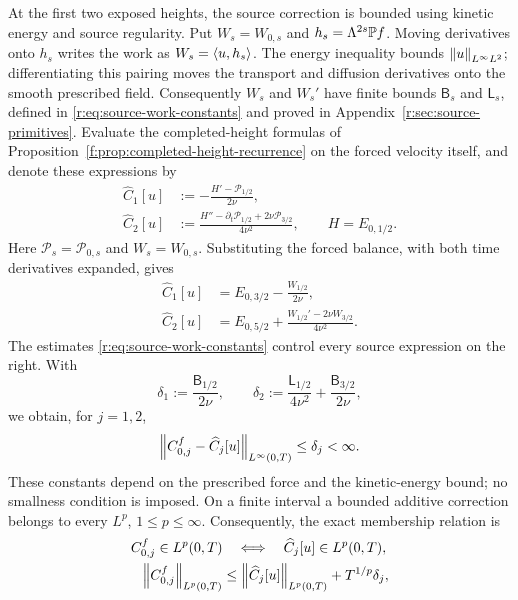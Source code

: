 At the first two exposed heights, the source correction is bounded
using kinetic energy and source regularity. Put \(W_s=W_{0,s}\) and
\(h_s=\Lambda^{2s}\mathbb P f\). Moving derivatives onto \(h_s\) writes the
work as \(W_s=\left\langle u,h_s\right\rangle\). The energy inequality bounds
\(\left\lVert u\right\rVert_{L^\infty L^2}\); differentiating this pairing moves the
transport and diffusion derivatives onto the smooth prescribed field.
Consequently \(W_s\) and \(W_s'\) have finite bounds
\(\mathsf B_s\) and \(\mathsf L_s\), defined in
\eqref{r:eq:source-work-constants} and proved in
Appendix~\ref{r:sec:source-primitives}.
Evaluate the completed-height formulas of
Proposition~\ref{f:prop:completed-height-recurrence} on the forced velocity
itself, and denote these expressions by
\begin{equation}
 \begin{aligned}
 \widehat C_1[u]
   &:=-\frac{H'-\mathcal P_{1/2}}{2\nu},\\
 \widehat C_2[u]
   &:=\frac{H''-\partial_t\mathcal P_{1/2}
                   +2\nu\mathcal P_{3/2}}{4\nu^2},
 \qquad H=E_{0,1/2}.
 \end{aligned}
 \label{r:eq:original-form-completions}
\end{equation}
Here \(\mathcal P_s=\mathcal P_{0,s}\) and \(W_s=W_{0,s}\).
Substituting the forced balance, with both time derivatives expanded,
gives
\begin{equation}
 \begin{aligned}
 \widehat C_1[u]
   &=E_{0,3/2}-\frac{W_{1/2}}{2\nu},\\
 \widehat C_2[u]
   &=E_{0,5/2}
       +\frac{W_{1/2}'-2\nu W_{3/2}}{4\nu^2}.
 \end{aligned}
 \label{r:eq:low-completion-source-shift}
\end{equation}
The estimates \eqref{r:eq:source-work-constants} control every source
expression on the right. With
\[
 \delta_1:=\frac{\mathsf B_{1/2}}{2\nu},
 \qquad
 \delta_2:=\frac{\mathsf L_{1/2}}{4\nu^2}
              +\frac{\mathsf B_{3/2}}{2\nu},
\]
we obtain, for \(j=1,2\),
\begin{equation}
 \left\lVert C^f_{0,j}-\widehat C_j[u]\right\rVert_{L^\infty(0,T)}
 \le\delta_j<\infty.
 \label{r:eq:low-completion-uniform-difference}
\end{equation}
These constants depend on the prescribed force and the kinetic-energy
bound; no smallness condition is imposed. On a finite interval a bounded
additive correction belongs to every \(L^p\), \(1\le p\le\infty\).
Consequently, the exact membership relation is
\begin{equation}
 \begin{aligned}
 C^f_{0,j}\in L^p(0,T)
   &\quad\Longleftrightarrow\quad
     \widehat C_j[u]\in L^p(0,T),\\
 \left\lVert C^f_{0,j}\right\rVert_{L^p(0,T)}
   &\le\left\lVert \widehat C_j[u]\right\rVert_{L^p(0,T)}
            +T^{1/p}\delta_j,
 \end{aligned}
 \label{r:eq:low-completion-space-preservation}
\end{equation}
